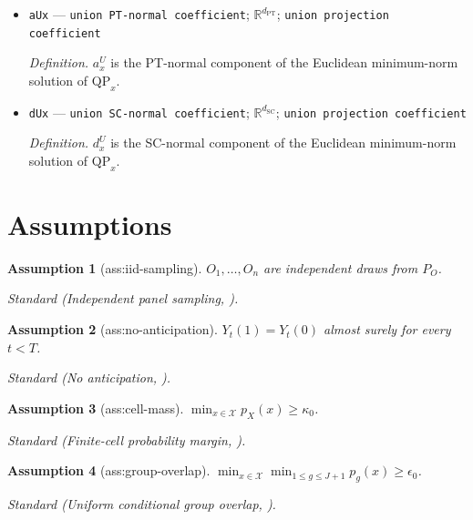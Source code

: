 \documentclass{article}
\newtheorem{assumption}{Assumption}
\begin{document}
\begin{itemize}
  \item \texttt{aUx} --- \texttt{union PT-\allowbreak{}normal coefficient}; \(\mathbb R^{d_{\mathrm{PT}}}\); \texttt{union projection coefficient}
  \par\smallskip\noindent\emph{Definition.} \(a_x^U\) is the PT-normal component of the Euclidean minimum-norm solution of \(\mathrm{QP}_x\).
  \item \texttt{dUx} --- \texttt{union SC-\allowbreak{}normal coefficient}; \(\mathbb R^{d_{\mathrm{SC}}}\); \texttt{union projection coefficient}
  \par\smallskip\noindent\emph{Definition.} \(d_x^U\) is the SC-normal component of the Euclidean minimum-norm solution of \(\mathrm{QP}_x\).
\end{itemize}

\section{Assumptions}

\begin{assumption}[ass:iid-sampling]\label{ass:iid-sampling}
\(O_1,\ldots,O_n\) are independent draws from \(P_O\).
\par\smallskip\noindent\emph{Standard} (Independent panel sampling, \cite{SunXieZhang2025}).
\end{assumption}

\begin{assumption}[ass:no-anticipation]\label{ass:no-anticipation}
\(Y_t(1)=Y_t(0)\) almost surely for every \(t<T\).
\par\smallskip\noindent\emph{Standard} (No anticipation, \cite{SunXieZhang2025}).
\end{assumption}

\begin{assumption}[ass:cell-mass]\label{ass:cell-mass}
\(\min_{x\in\mathcal X}p_X(x)\ge\kappa_0\).
\par\smallskip\noindent\emph{Standard} (Finite-cell probability margin, \cite{TchetgenTchetgenRobinsRotnitzky2010}).
\end{assumption}

\begin{assumption}[ass:group-overlap]\label{ass:group-overlap}
\(\min_{x\in\mathcal X}\min_{1\le g\le J+1}p_g(x)\ge\epsilon_0\).
\par\smallskip\noindent\emph{Standard} (Uniform conditional group overlap, \cite{SunXieZhang2025}).
\end{assumption}
\end{document}
